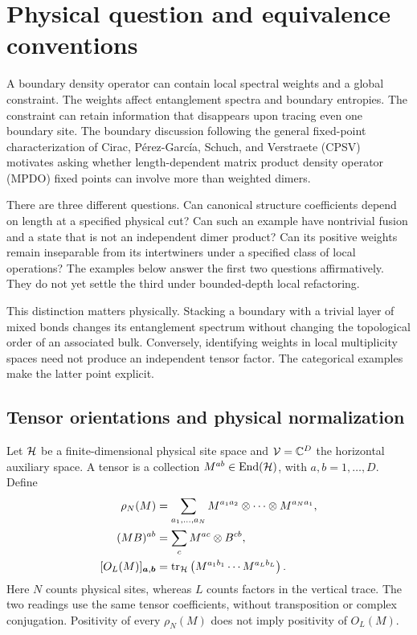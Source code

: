 \section{Physical question and equivalence conventions}
\label{sec:intrinsic-question}

A boundary density operator can contain local spectral weights and a
global constraint. The weights affect entanglement spectra and boundary
entropies. The constraint can retain information that disappears upon
tracing even one boundary site. The boundary discussion following the
general fixed-point characterization of Cirac, P\'erez-Garc\'ia,
Schuch, and Verstraete (CPSV)~\cite{CPSV} motivates asking whether
length-dependent matrix product density operator (MPDO) fixed points
can involve more than weighted dimers.

There are three different questions. Can canonical structure
coefficients depend on length at a specified physical cut? Can such
an example have nontrivial fusion and a state that is not an independent
dimer product? Can its positive weights remain inseparable from its
intertwiners under a specified class of local operations? The examples
below answer the first two questions affirmatively. They do not yet
settle the third under bounded-depth local refactoring.

This distinction matters physically. Stacking a boundary with a trivial
layer of mixed bonds changes its entanglement spectrum without changing
the topological order of an associated bulk. Conversely, identifying
weights in local multiplicity spaces need not produce an independent
tensor factor. The categorical examples make the latter point explicit.

\subsection{Tensor orientations and physical normalization}

Let $\mathcal{H}$ be a finite-dimensional physical site space and
$\mathcal{V}=\mathbb{C}^D$ the horizontal auxiliary space. A tensor is a collection
$M^{ab}\in\operatorname{End}(\mathcal{H})$, with $a,b=1,\ldots,D$. Define
\begin{align}
	\rho_N(M)
	 & =\sum_{a_1,\ldots,a_N}
	M^{a_1a_2}\otimes\cdots\otimes M^{a_Na_1},
	\label{eq:horizontal}            \\
	(MB)^{ab}
	 & =\sum_c M^{ac}\otimes B^{cb},
	\label{eq:concatenation}         \\
	[O_L(M)]_{\boldsymbol a,\boldsymbol b}
	 & =\operatorname{tr}_{\mathcal{H}}
	\left(M^{a_1b_1}\cdots M^{a_Lb_L}\right).
	\label{eq:vertical}
\end{align}
Here $N$ counts physical sites, whereas $L$ counts factors in the
vertical trace. The two readings use the same tensor coefficients,
without transposition or complex conjugation. Positivity of every
$\rho_N(M)$ does not imply positivity of $O_L(M)$.


